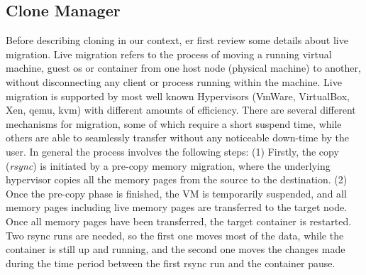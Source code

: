 
\subsection{Clone Manager} 
\label{sec:CloneManager}



Before describing cloning in our context, er first review some details about
live migration. 
Live migration refers to the process of moving a running virtual machine, guest os or container from one host node (physical machine) to another, without disconnecting any client or process running within the machine. 
Live migration is supported by most well known Hypervisors (VmWare, VirtualBox, Xen, qemu, kvm) with different amounts of efficiency.
There are several different mechanisms for migration, some of which require a short suspend time, while others are able to seamlessly transfer without any noticeable down-time by the user.
In general the process involves the following steps: 
(1) Firstly, the copy (\textit{rsync}) is initiated by a pre-copy memory migration, where the underlying hypervisor copies all the memory pages from the source to the destination. 
(2) Once the pre-copy phase is finished, the VM is temporarily suspended, and all memory pages including live memory pages are transferred to the target node. 
Once all memory pages have been transferred, 
the target container is restarted. 
Two rsync runs are needed, so the first one moves most of the data, while the container is still up and running, and the second one moves the changes made during the time period between the first rsync run and the container pause.

